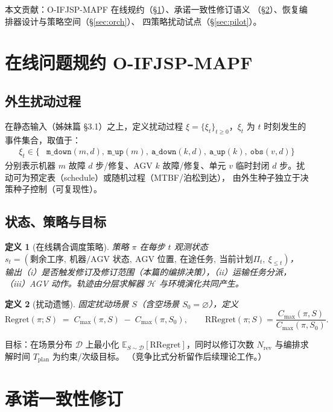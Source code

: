 \documentclass[UTF8,12pt,a4paper]{ctexart}
\newtheorem{definition}{定义}
\newcommand{\Cmax}{C_{\max}}
\begin{document}
本文贡献：O-IFJSP-MAPF 在线规约（\S\ref{sec:form}）、承诺一致性修订语义
（\S\ref{sec:revision}）、恢复编排器设计与策略空间（\S\ref{sec:orch}）、
四策略扰动试点（\S\ref{sec:pilot}）。

\section{在线问题规约 O-IFJSP-MAPF}\label{sec:form}

\subsection{外生扰动过程}

在静态输入（姊妹篇 \S3.1）之上，定义扰动过程
$\xi=\{\xi_t\}_{t\ge0}$，$\xi_t$ 为 $t$ 时刻发生的事件集合，取值于：
\begin{align}
\xi_t \in \{&\texttt{m\_down}(m,d),\ \texttt{m\_up}(m),\
\texttt{a\_down}(k,d),\ \texttt{a\_up}(k),\ \texttt{obs}(v,d)\}
\end{align}
分别表示机器 $m$ 故障 $d$ 步/修复、AGV $k$ 故障/修复、单元 $v$ 临时封闭
$d$ 步。扰动可为预定表（schedule）或随机过程（MTBF/泊松到达），
由外生种子独立于决策种子控制（可复现性）。

\subsection{状态、策略与目标}

\begin{definition}[在线耦合调度策略]
策略 $\pi$ 在每步 $t$ 观测状态
$s_t=(\text{剩余工序},\ \text{机器/AGV 状态},\ \text{AGV 位置},\ \text{在途任务},\ \text{当前计划}\Pi_t,\ \xi_{\le t})$，
输出（i）是否触发修订及修订范围（本篇的编排决策），（ii）运输任务分派，
（iii）AGV 动作。轨迹由分层求解器 $\mathcal{H}$ 与环境演化共同产生。
\end{definition}

\begin{definition}[扰动遗憾]
固定扰动场景 $S$（含空场景 $S_0=\varnothing$），定义
\[
\mathrm{Regret}(\pi;S) \;=\; \Cmax(\pi,S)\;-\;\Cmax(\pi,S_0),
\qquad
\mathrm{RRegret}(\pi;S)=\frac{\Cmax(\pi,S)}{\Cmax(\pi,S_0)}.
\]
\end{definition}

目标：在场景分布 $\mathcal{D}$ 上最小化
$\mathbb{E}_{S\sim\mathcal{D}}[\mathrm{RRegret}]$，同时以修订次数
$N_{\text{rev}}$ 与编排求解时间 $T_{\text{plan}}$ 为约束/次级目标。
（竞争比式分析留作后续理论工作。）

\section{承诺一致性修订}\label{sec:revision}
\end{document}
